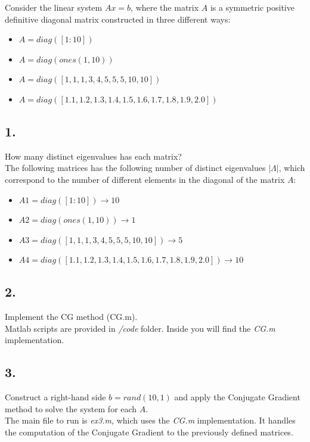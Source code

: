 \documentclass[unicode,11pt,a4paper,oneside,numbers=endperiod,openany]{scrartcl}
\begin{document}
Consider the linear system $Ax = b$,
where the matrix $A$ is a symmetric positive definitive diagonal matrix
constructed in three different ways:

\begin{itemize}
    \item[ ] $A = diag([1:10])$
    \item[ ] $A = diag(ones(1,10))$
    \item[ ] $A = diag([1, 1, 1, 3, 4, 5, 5, 5, 10, 10])$
    \item[ ] $A = diag([1.1, 1.2, 1.3, 1.4, 1.5, 1.6, 1.7, 1.8, 1.9, 2.0])$
\end{itemize}

\subsection*{1.}
How many distinct eigenvalues has each matrix?\\

The following matrices has the following number of distinct eigenvalues $| \Lambda |$,
which correspond to the number of different elements in the diagonal of the matrix $A$:
\begin{itemize}
    \item[ ] $A1 = diag([1:10]) \rightarrow 10$
    \item[ ] $A2 = diag(ones(1,10)) \rightarrow 1$
    \item[ ] $A3 = diag([1, 1, 1, 3, 4, 5, 5, 5, 10, 10]) \rightarrow 5$
    \item[ ] $A4 = diag([1.1, 1.2, 1.3, 1.4, 1.5, 1.6, 1.7, 1.8, 1.9, 2.0]) \rightarrow 10$
\end{itemize}

\subsection*{2.}
Implement the CG method (CG.m).\\

Matlab scripts are provided in \textit{/code} folder.
Inside you will find the \textit{CG.m} implementation.

\subsection*{3.}
Construct a right-hand side $b = rand(10,1)$
and apply the Conjugate Gradient method to solve the system for each $A$.\\

The main file to run is \textit{ex3.m}, which uses the \textit{CG.m} implementation.
It handles the computation of the Conjugate Gradient to the previously defined matrices.
\end{document}
